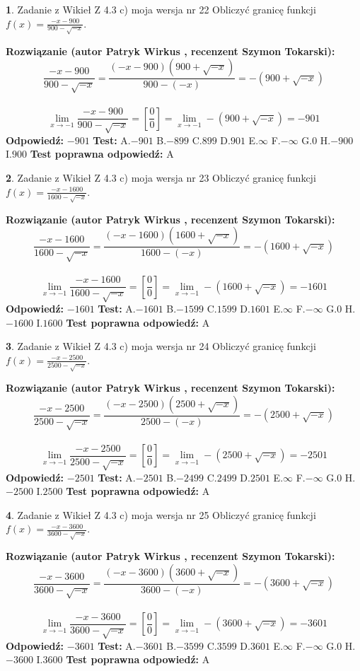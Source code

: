 \documentclass[12pt, a4paper]{article}
\theoremstyle{definition} %
\newtheorem{zad}{}
\newcommand{\zadStart}[1]{\begin{zad}#1\newline}
\newcommand{\zadStop}{\end{zad}}
\newcommand{\rozwStart}[2]{\noindent \textbf{Rozwiązanie (autor #1 , recenzent #2): }\newline}
\newcommand{\rozwStop}{\newline}
\newcommand{\odpStart}{\noindent \textbf{Odpowiedź:}\newline}
\newcommand{\odpStop}{\newline}
\newcommand{\testStart}{\noindent \textbf{Test:}\newline}
\newcommand{\testStop}{\newline}
\newcommand{\kluczStart}{\noindent \textbf{Test poprawna odpowiedź:}\newline}
\newcommand{\kluczStop}{\newline}
\begin{document}
\zadStart{Zadanie z Wikieł Z 4.3 c) moja wersja nr 22}
Obliczyć granicę funkcji $f(x)=\frac{-x-900}{900-\sqrt{-x}}$.
\zadStop
\rozwStart{Patryk Wirkus}{Szymon Tokarski}
$$\frac{-x-900}{900-\sqrt{-x}}=\frac{(-x-900)(900+\sqrt{-x})}{900-(-x)}=-(900+\sqrt{-x})$$
\\
$$\lim\limits_{x\to-1}\frac{-x-900}{900-\sqrt{-x}}=[\frac{0}{0}]=\lim\limits_{x\to-1}-(900+\sqrt{-x}) =-901$$
\rozwStop
\odpStart
$-901$
\odpStop
\testStart
A.$-901$
B.$-899$
C.$899$
D.$901$
E.$\infty$
F.$-\infty$
G.$0$
H.$-900$
I.$900$
\testStop
\kluczStart
A
\kluczStop



\zadStart{Zadanie z Wikieł Z 4.3 c) moja wersja nr 23}
Obliczyć granicę funkcji $f(x)=\frac{-x-1600}{1600-\sqrt{-x}}$.
\zadStop
\rozwStart{Patryk Wirkus}{Szymon Tokarski}
$$\frac{-x-1600}{1600-\sqrt{-x}}=\frac{(-x-1600)(1600+\sqrt{-x})}{1600-(-x)}=-(1600+\sqrt{-x})$$
\\
$$\lim\limits_{x\to-1}\frac{-x-1600}{1600-\sqrt{-x}}=[\frac{0}{0}]=\lim\limits_{x\to-1}-(1600+\sqrt{-x}) =-1601$$
\rozwStop
\odpStart
$-1601$
\odpStop
\testStart
A.$-1601$
B.$-1599$
C.$1599$
D.$1601$
E.$\infty$
F.$-\infty$
G.$0$
H.$-1600$
I.$1600$
\testStop
\kluczStart
A
\kluczStop



\zadStart{Zadanie z Wikieł Z 4.3 c) moja wersja nr 24}
Obliczyć granicę funkcji $f(x)=\frac{-x-2500}{2500-\sqrt{-x}}$.
\zadStop
\rozwStart{Patryk Wirkus}{Szymon Tokarski}
$$\frac{-x-2500}{2500-\sqrt{-x}}=\frac{(-x-2500)(2500+\sqrt{-x})}{2500-(-x)}=-(2500+\sqrt{-x})$$
\\
$$\lim\limits_{x\to-1}\frac{-x-2500}{2500-\sqrt{-x}}=[\frac{0}{0}]=\lim\limits_{x\to-1}-(2500+\sqrt{-x}) =-2501$$
\rozwStop
\odpStart
$-2501$
\odpStop
\testStart
A.$-2501$
B.$-2499$
C.$2499$
D.$2501$
E.$\infty$
F.$-\infty$
G.$0$
H.$-2500$
I.$2500$
\testStop
\kluczStart
A
\kluczStop



\zadStart{Zadanie z Wikieł Z 4.3 c) moja wersja nr 25}
Obliczyć granicę funkcji $f(x)=\frac{-x-3600}{3600-\sqrt{-x}}$.
\zadStop
\rozwStart{Patryk Wirkus}{Szymon Tokarski}
$$\frac{-x-3600}{3600-\sqrt{-x}}=\frac{(-x-3600)(3600+\sqrt{-x})}{3600-(-x)}=-(3600+\sqrt{-x})$$
\\
$$\lim\limits_{x\to-1}\frac{-x-3600}{3600-\sqrt{-x}}=[\frac{0}{0}]=\lim\limits_{x\to-1}-(3600+\sqrt{-x}) =-3601$$
\rozwStop
\odpStart
$-3601$
\odpStop
\testStart
A.$-3601$
B.$-3599$
C.$3599$
D.$3601$
E.$\infty$
F.$-\infty$
G.$0$
H.$-3600$
I.$3600$
\testStop
\kluczStart
A
\kluczStop
\end{document}
